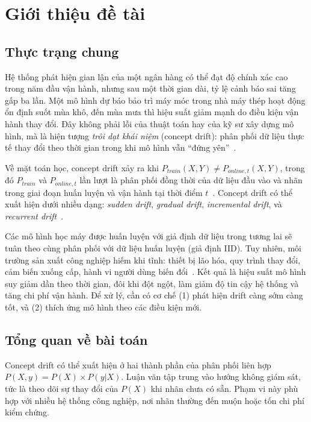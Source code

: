 \chapter{Giới thiệu đề tài}

\section{Thực trạng chung}
Hệ thống phát hiện gian lận của một ngân hàng có thể đạt độ chính xác cao
trong năm đầu vận hành, nhưng sau một thời gian dài, tỷ lệ cảnh báo sai
tăng gấp ba lần. Một mô hình dự báo bảo trì máy móc trong nhà máy thép
hoạt động ổn định suốt mùa khô, đến mùa mưa thì hiệu suất giảm mạnh
do điều kiện vận hành thay đổi. Đây không phải lỗi của thuật toán hay
của kỹ sư xây dựng mô hình, mà là hiện tượng \textit{trôi dạt khái niệm}
(concept drift): phân phối dữ liệu thực tế thay đổi theo thời gian trong
khi mô hình vẫn ``đứng yên''~\cite{jourdan2023process}.

Về mặt toán học, concept drift xảy ra khi $P_{train}(X, Y) \neq P_{online,t}(X, Y)$,
trong đó $P_{train}$ và $P_{online,t}$ lần lượt là phân phối đồng thời của dữ liệu
đầu vào và nhãn trong giai đoạn huấn luyện và vận hành tại thời điểm $t$~\cite{jourdan2023process}.
Concept drift có thể xuất hiện dưới nhiều dạng: \textit{sudden drift},
\textit{gradual drift}, \textit{incremental drift}, và \textit{recurrent drift}~\cite{yuan2022advances}.

Các mô hình học máy được huấn luyện với giả định dữ liệu trong tương lai
sẽ tuân theo cùng phân phối với dữ liệu huấn luyện (giả định IID). Tuy nhiên,
môi trường sản xuất công nghiệp hiếm khi tĩnh: thiết bị lão hóa, quy trình thay đổi,
cảm biến xuống cấp, hành vi người dùng biến đổi~\cite{jourdan2023process}. Kết quả là
hiệu suất mô hình suy giảm dần theo thời gian, đôi khi đột ngột, làm giảm
độ tin cậy hệ thống và tăng chi phí vận hành. Để xử lý, cần có cơ chế
(1) phát hiện drift càng sớm càng tốt, và (2) thích ứng mô hình theo các điều kiện mới.

\section{Tổng quan về bài toán}
Concept drift có thể xuất hiện ở hai thành phần của phân phối liên hợp $P(X, y) = P(X) \times P(y|X)$. Luận văn tập trung vào hướng không giám sát, tức là theo dõi sự thay đổi của $P(X)$ khi nhãn chưa có sẵn. Phạm vi này phù hợp với nhiều hệ thống công nghiệp, nơi nhãn thường đến muộn hoặc tốn chi phí kiểm chứng.

